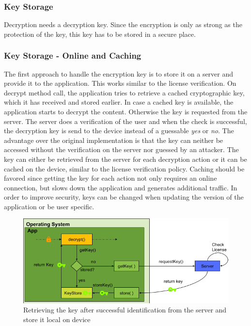 \subsubsection{Key Storage} \label{section:counter-replace-encryption-key-online}
Decryption needs a decryption key.
Since the encryption is only as strong as the protection of the key, this key has to be stored in a secure place.

\subsubsection{Key Storage - Online and Caching} \label{section:counter-replace-encryption-key-online}
The first approach to handle the encryption key is to store it on a server and provide it to the application.
This works similar to the license verification.
\newline
On decrypt method call, the application tries to retrieve a cached cryptographic key, which it has received and stored earlier.
In case a cached key is available, the application starts to decrypt the content.
Otherwise the key is requested from the server.
The server does a verification of the user and when the check is successful, the decryption key is send to the device instead of a guessable \textit{yes} or \textit{no}.
The advantage over the original implementation is that the key can neither be accessed without the verification on the server nor guessed by an attacker.
\newline
The key can either be retrieved from the server for each decryption action or it can be cached on the device, similar to the license verification policy.
Caching should be favored since getting the key for each action not only requires an online connection, but slows down the application and generates additional traffic.
\newline
In order to improve security, keys can be changed when updating the version of the application or be user specific.
\begin{figure}[h]
    \centering
    \includegraphics[width=1\textwidth]{data/encryptionKeyServer.png}
    \caption{Retrieving the key after successful identification from the server and store it local on device}
    \label{fig:encryptionKeyServer}
\end{figure}

